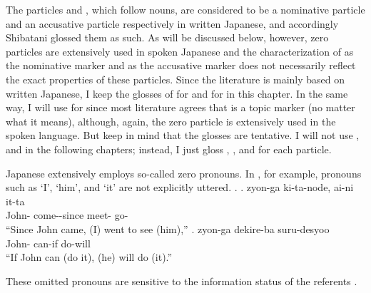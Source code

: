 The particles  and , which follow nouns, are considered to be a nominative particle and an accusative particle respectively in written Japanese,
and accordingly Shibatani glossed them as such.
As will be discussed below, however,
zero particles are extensively used in spoken Japanese and
the characterization of  as the nominative marker and  as the accusative marker does not necessarily reflect the exact properties of these particles.
Since the literature is mainly based on written Japanese,
I keep the glosses of  for  and  for  in this chapter.
In the same way, I will use  for  since
most literature agrees that  is a topic marker (no matter what it means),
although, again, the zero particle is extensively used in the spoken language.
But keep in mind that the glosses are tentative.
I will not use  , and  in the following chapters;
instead, I just gloss , , and  for each particle.

Japanese extensively employs so-called zero pronouns.
In \Next, for example,
pronouns such as `I', `him', and `it' are not explicitly uttered.
%
\ex.
 \ag. zyon-ga ki-ta-node, ai-ni it-ta \\
      John- come--since meet- go- \\
      ``Since John came, (I) went to see (him),''
 \bg. zyon-ga dekire-ba suru-desyoo \\
      John- can-if do-will \\
      ``If John can (do it), (he) will do (it).''
      \hfill{\cite[p.~17]{kuno73}}

These omitted pronouns are sensitive to the information status of the referents \cite[see][Chapter 1]{kuno78}.


